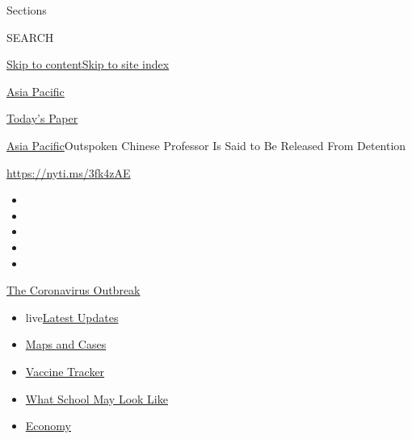Sections

SEARCH

\protect\hyperlink{site-content}{Skip to
content}\protect\hyperlink{site-index}{Skip to site index}

\href{https://www.nytimes.com/section/world/asia}{Asia Pacific}

\href{https://myaccount.nytimes.com/auth/login?response_type=cookie\&client_id=vi}{}

\href{https://www.nytimes.com/section/todayspaper}{Today's Paper}

\href{/section/world/asia}{Asia Pacific}\textbar{}Outspoken Chinese
Professor Is Said to Be Released From Detention

\url{https://nyti.ms/3fk4zAE}

\begin{itemize}
\item
\item
\item
\item
\item
\end{itemize}

\href{https://www.nytimes.com/news-event/coronavirus?action=click\&pgtype=Article\&state=default\&region=TOP_BANNER\&context=storylines_menu}{The
Coronavirus Outbreak}

\begin{itemize}
\tightlist
\item
  live\href{https://www.nytimes.com/2020/08/02/world/coronavirus-updates.html?action=click\&pgtype=Article\&state=default\&region=TOP_BANNER\&context=storylines_menu}{Latest
  Updates}
\item
  \href{https://www.nytimes.com/interactive/2020/us/coronavirus-us-cases.html?action=click\&pgtype=Article\&state=default\&region=TOP_BANNER\&context=storylines_menu}{Maps
  and Cases}
\item
  \href{https://www.nytimes.com/interactive/2020/science/coronavirus-vaccine-tracker.html?action=click\&pgtype=Article\&state=default\&region=TOP_BANNER\&context=storylines_menu}{Vaccine
  Tracker}
\item
  \href{https://www.nytimes.com/interactive/2020/07/29/us/schools-reopening-coronavirus.html?action=click\&pgtype=Article\&state=default\&region=TOP_BANNER\&context=storylines_menu}{What
  School May Look Like}
\item
  \href{https://www.nytimes.com/live/2020/07/31/business/stock-market-today-coronavirus?action=click\&pgtype=Article\&state=default\&region=TOP_BANNER\&context=storylines_menu}{Economy}
\end{itemize}

